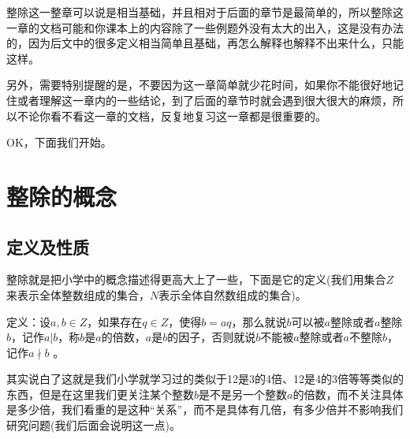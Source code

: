 \documentclass[12pt, a4paper, oneside]{ctexart}
\begin{document}
整除这一整章可以说是相当基础，并且相对于后面的章节是最简单的，所以整除这一章的文档可能和你课本上的内容除了一些例题外没有太大的出入，这是没有办法的，因为后文中的很多定义相当简单且基础，再怎么解释也解释不出来什么，只能这样。

另外，需要特别提醒的是，不要因为这一章简单就少花时间，如果你不能很好地记住或者理解这一章内的一些结论，到了后面的章节时就会遇到很大很大的麻烦，所以不论你看不看这一章的文档，反复地复习这一章都是很重要的。

OK，下面我们开始。

\section*{整除的概念}
\subsection*{定义及性质}

整除就是把小学中的概念描述得更高大上了一些，下面是它的定义(我们用集合$Z$来表示全体整数组成的集合，$N$表示全体自然数组成的集合)。

定义：设$a,b\in Z$，如果存在$q\in Z$，使得$b=aq$，那么就说$b$可以被$a$整除或者$a$整除$b$，记作$a|b$，称$b$是$a$的倍数，$a$是$b$的因子，否则就说$b$不能被$a$整除或者$a$不整除$b$，记作$a\nmid b$ 。

其实说白了这就是我们小学就学习过的类似于12是3的4倍、12是4的3倍等等类似的东西，但是在这里我们更关注某个整数$b$是不是另一个整数$a$的倍数，而不关注具体是多少倍，我们看重的是这种“关系”，而不是具体有几倍，有多少倍并不影响我们研究问题(我们后面会说明这一点)。
\end{document}
